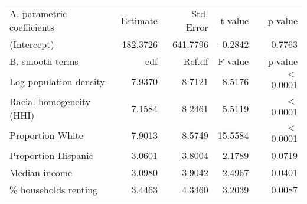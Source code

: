 \begin{table}[ht]
\centering
\begin{tabular}{lrrrr}
   \hline
A. parametric coefficients & Estimate & Std. Error & t-value & p-value \\ 
  (Intercept) & -182.3726 & 641.7796 & -0.2842 & 0.7763 \\ 
   \hline
B. smooth terms & edf & Ref.df & F-value & p-value \\ 
  Log population density & 7.9370 & 8.7121 & 8.5176 & $<$ 0.0001 \\ 
  Racial homogeneity (HHI) & 7.1584 & 8.2461 & 5.5119 & $<$ 0.0001 \\ 
  Proportion White & 7.9013 & 8.5749 & 15.5584 & $<$ 0.0001 \\ 
  Proportion Hispanic & 3.0601 & 3.8004 & 2.1789 & 0.0719 \\ 
  Median income & 3.0980 & 3.9042 & 2.4967 & 0.0401 \\ 
  \% households renting & 3.4463 & 4.3460 & 3.2039 & 0.0087 \\ 
   \hline
\end{tabular}
\caption{ } 
\label{Demographic GAM}
\end{table}
